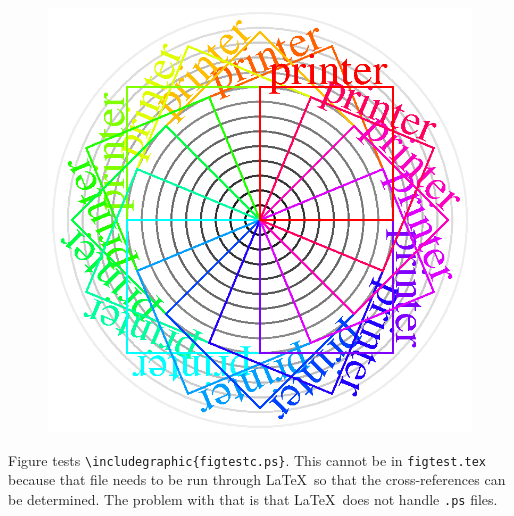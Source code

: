 \documentclass{article}
\begin{document}
\begin{figure}
\includegraphics{figtestc.ps}
\end{figure}

Figure tests \verb#\includegraphic{figtestc.ps}#.  This cannot be in
\texttt{figtest.tex} because that file needs to be run through \LaTeX\
so that the cross-references can be determined.  The problem with
that is that \LaTeX\ does not handle \texttt{.ps} files.  
\end{document}
